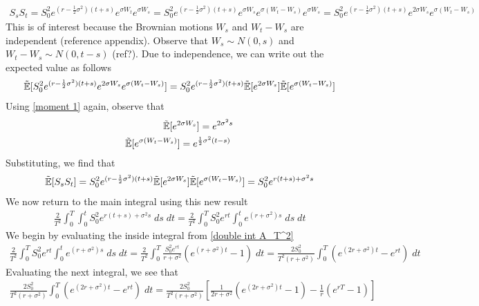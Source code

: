 \documentclass[reqno]{amsart}
\newcommand{\rE}[1]{\tilde{\E}[#1]}
\begin{document}
\begin{align}
     S_{s} S_{t} 
     = S_0^2 e^{(r-\frac{1}{2}\sigma^2)(t+s)} e^{\sigma W_t} e^{\sigma W_s}
     = S_0^2 e^{(r-\frac{1}{2}\sigma^2)(t+s)} e^{\sigma W_s} e^{\sigma (W_t - W_s)} e^{\sigma W_s}
     = S_0^2 e^{(r-\frac{1}{2}\sigma^2)(t+s)} e^{2 \sigma W_s} e^{\sigma (W_t - W_s)}
\end{align}
This is of interest because the Brownian motions $W_s$ and $W_t - W_s$ are independent (reference appendix).
Observe that $W_s \sim N(0, s)$ and $W_t - W_s \sim N(0, t-s)$ (ref?). Due to independence, we can write out the expected value as follows
\begin{align}
     \rE{S_0^2 e^{(r-\frac{1}{2}\sigma^2)(t+s)}e^{2 \sigma W_s} e^{\sigma (W_t - W_s)}}
     = S_0^2 e^{(r-\frac{1}{2}\sigma^2)(t+s)} \rE{e^{2 \sigma W_s}} \rE{e^{\sigma (W_t - W_s)}}
\end{align}
Using \eqref{moment 1} again, observe that
\begin{align}
     \rE{e^{2 \sigma W_s}} = e^{2 \sigma^2 s} \\
     \rE{e^{\sigma (W_t - W_s)}} = e^{\frac{1}{2} \sigma^2 (t-s)} \;
\end{align}
Substituting, we find that
\begin{align}
     \rE{S_{s} S_{t}} 
     = S_0^2 e^{(r-\frac{1}{2}\sigma^2)(t+s)} \rE{e^{2 \sigma W_s}} \rE{e^{\sigma (W_t - W_s)}}
     = S_0^2 e^{r(t+s)+\sigma^2s}
\end{align}
We now return to the main integral using this new result
\begin{align} \label{double int A_T^2}
     \frac{2}{T^2} \int_0^T \int_0^t S_0^2 e^{r(t+s)+\sigma^2s} \; ds \; dt = \frac{2}{T^2} \int_0^T S_0^2 e^{rt} \int_0^t e^{(r + \sigma^2)s} \; ds \; dt
\end{align}
We begin by evaluating the inside integral from \eqref{double int A_T^2}
\begin{align}
     \frac{2}{T^2} \int_0^T S_0^2 e^{rt} \int_0^t e^{(r + \sigma^2)s} \; ds \; dt = \frac{2}{T^2} \int_0^T \frac{S_0^2 e^{rt}}{r + \sigma^2} (e^{(r+\sigma^2)t} - 1) \; dt = \frac{2 S_0^2}{T^2(r + \sigma^2)} \int_0^T  (e^{(2r+\sigma^2)t} - e^{rt}) \; dt
\end{align}
Evaluating the next integral, we see that
\begin{align}
     \frac{2 S_0^2}{T^2(r + \sigma^2)} \int_0^T  (e^{(2r+\sigma^2)t} - e^{rt}) \; dt = \frac{2 S_0^2}{T^2(r + \sigma^2)} \left[ \frac{1}{2r+\sigma^2} \left( e^{(2r + \sigma^2)t} - 1 \right) - \frac{1}{r} \left( e^{rT} - 1 \right) \right]
\end{align}
\end{document}
